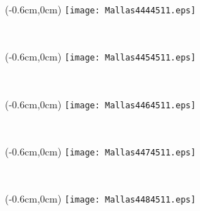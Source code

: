 \documentclass[12pt,letterpaper,oneside]{report}
\begin{document}
\begin{textblock*}{\paperwidth}(-0.6cm,0cm)
\texttt{[image: Mallas4444511.eps]}
\end{textblock*}

\ \pagebreak
\begin{textblock*}{\paperwidth}(-0.6cm,0cm)
\texttt{[image: Mallas4454511.eps]}
\end{textblock*}

\ \pagebreak
\begin{textblock*}{\paperwidth}(-0.6cm,0cm)
\texttt{[image: Mallas4464511.eps]}
\end{textblock*}

\ \pagebreak
\begin{textblock*}{\paperwidth}(-0.6cm,0cm)
\texttt{[image: Mallas4474511.eps]}
\end{textblock*}

\ \pagebreak
\begin{textblock*}{\paperwidth}(-0.6cm,0cm)
\texttt{[image: Mallas4484511.eps]}
\end{textblock*}

\ \pagebreak
\end{document}
